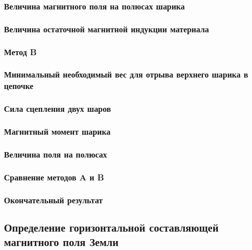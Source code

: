 \documentclass[a4paper, 12pt]{article}
\begin{document}
            \subsubsection{Величина магнитного поля на полюсах шарика}

            \subsubsection{Величина остаточной магнитной индукции материала}

            \subsubsection*{\textbf{Метод B}}
            \subsubsection{Минимальный необходимый вес для отрыва верхнего шарика в цепочке}

            \subsubsection{Сила сцепления двух шаров}

            \subsubsection{Магнитный момент шарика}

            \subsubsection{Величина поля на полюсах}

            \subsubsection{Сравнение методов A и B}

            \subsubsection{Окончательный результат}

        \subsection{Определение горизонтальной составляющей магнитного поля Земли}
\end{document}
